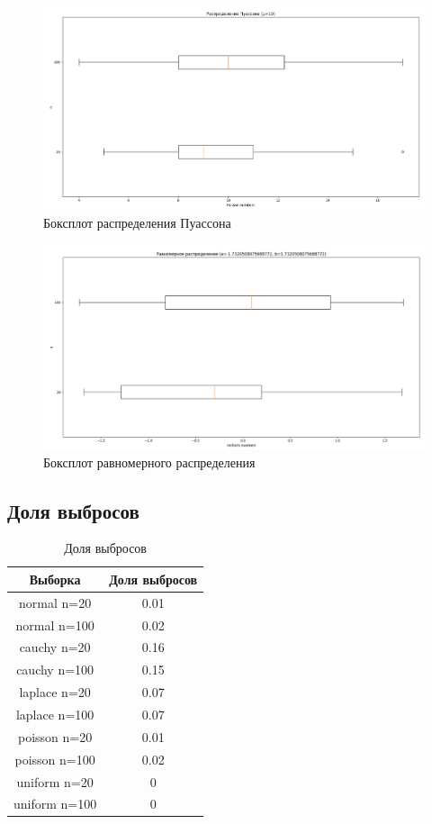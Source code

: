 \begin{figure}[H]
	\centering
	\includegraphics[scale=0.3]{resources/3_poisson.png}
	\caption{Боксплот распределения Пуассона}
\end{figure}

\begin{figure}[H]
	\centering
	\includegraphics[scale=0.3]{resources/3_uniform.png}
	\caption{Боксплот равномерного распределения}
\end{figure}

\subsection{Доля выбросов}

\begin{table}[H]
	\begin{center}
		\begin{tabular}{|c|c|}
			\hline
			Выборка & Доля выбросов \\
			\hline\hline
			normal n=20 & 0.01\\
			\hline 
			normal n=100 & 0.02\\
			\hline
			cauchy n=20 & 0.16\\
			\hline 
			cauchy n=100 & 0.15\\
			\hline
			laplace n=20 & 0.07\\
			\hline 
			laplace n=100 & 0.07\\
			\hline
			poisson n=20 & 0.01\\
			\hline 
			poisson n=100 & 0.02\\
			\hline
			uniform n=20 & 0\\
			\hline 
			uniform n=100 & 0\\
			\hline
		\end{tabular}
	\end{center}
	\caption{Доля выбросов}
\end{table}

